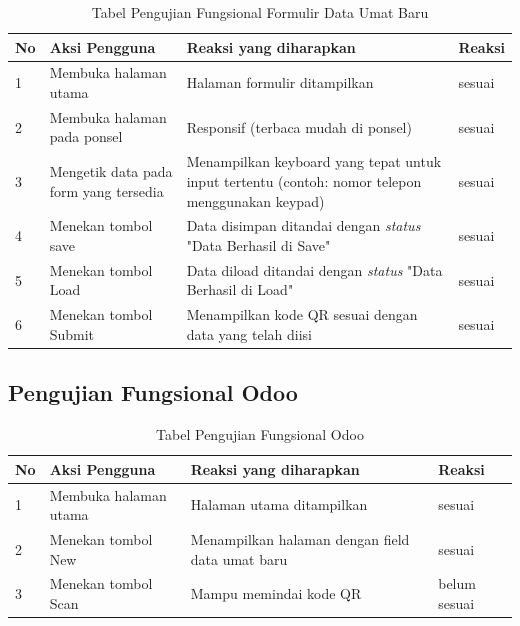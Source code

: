 \begin{table}[H]
	\centering
	\caption{Tabel Pengujian Fungsional Formulir Data Umat Baru}
	\begin{tabular}{|p{0.5cm}| p{5cm}| p{6cm}| p{2.5cm}|} \hline
		No	&	Aksi Pengguna	&	Reaksi yang diharapkan	&	Reaksi \\ \hline
		1 	&  Membuka halaman utama & Halaman formulir ditampilkan &	sesuai	\\ \hline
		2 	&  Membuka halaman pada ponsel & Responsif (terbaca mudah di ponsel) &	sesuai	\\ \hline
		3 	&  Mengetik data pada form yang tersedia & Menampilkan keyboard yang tepat untuk input tertentu (contoh: nomor telepon menggunakan keypad) &	sesuai	\\ \hline
		4 	&  Menekan tombol save & Data disimpan ditandai dengan \textit{status} "Data Berhasil di Save" &	sesuai	\\ \hline
		5 	&  Menekan tombol Load & Data diload ditandai dengan \textit{status} "Data Berhasil di Load" &	sesuai	\\ \hline
		6 	&  Menekan tombol Submit & Menampilkan kode QR sesuai dengan data yang telah diisi &	sesuai	\\ \hline
	\end{tabular}
	\label{table:fungsionalFormulir}
\end{table}

\subsection{Pengujian Fungsional Odoo}
\label{sec:pengujianFungsionalOdoo}

\begin{table}[H]
	\centering
	\caption{Tabel Pengujian Fungsional Odoo}
	\begin{tabular}{|p{0.5cm}| p{5cm}| p{6cm}| p{2.5cm}|} \hline
		No	&	Aksi Pengguna	&	Reaksi yang diharapkan	&	Reaksi \\ \hline
		1 	&  Membuka halaman utama & Halaman utama ditampilkan &	sesuai	\\ \hline
		2 	&  Menekan tombol New & Menampilkan halaman dengan field data umat baru &	sesuai	\\ \hline
		3 	&  Menekan tombol Scan & Mampu memindai kode QR  &	belum sesuai	\\ \hline
	\end{tabular}
	\label{table:fungsionalOdoo}
\end{table}

